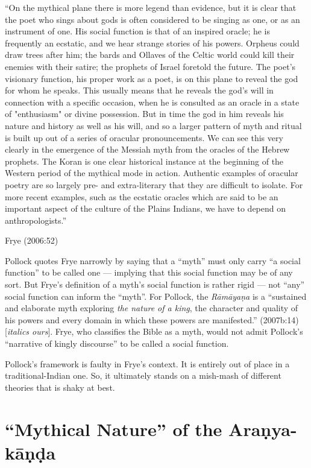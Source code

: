 \begin{myquote}
“On the mythical plane there is more legend than evidence, but it is clear that the poet who sings about gods is often considered to be singing as one, or as an instrument of one. His social function is that of an inspired oracle; he is frequently an ecstatic, and we hear strange stories of his powers. Orpheus could draw trees after him; the bards and Ollaves of the Celtic world could kill their enemies with their satire; the prophets of Israel foretold the future. The poet's visionary function, his proper work as a poet, is on this plane to reveal the god for whom he speaks. This usually means that he reveals the god's will in connection with a specific occasion, when he is consulted as an oracle in a state of "enthusiasm" or divine possession. But in time the god in him reveals his nature and history as well as his will, and so a larger pattern of myth and ritual is built up out of a series of oracular pronouncements. We can see this very clearly in the emergence of the Messiah myth from the oracles of the Hebrew prophets. The Koran is one clear historical instance at the beginning of the Western period of the mythical mode in action. Authentic examples of oracular poetry are so largely pre- and extra-literary that they are difficult to isolate. For more recent examples, such as the ecstatic oracles which are said to be an important aspect of the culture of the Plains Indians, we have to depend on anthropologists.”

\hfill Frye (2006:52)
\end{myquote}

Pollock quotes Frye narrowly by saying that a “myth” must only carry  “a social function” to be called one --- implying that this social function may be of any sort. But Frye’s definition of a myth’s social function is rather rigid --- not “any” social function can inform the “myth”. For Pollock, the {\sl Rāmāyaṇa} is a “sustained and elaborate myth exploring {\sl the nature of a king}, the character and quality of his powers and every domain in which these powers are manifested.” (2007b:14) [{\sl italics ours}]. Frye, who classifies the Bible as a myth, would not admit Pollock’s “narrative of kingly discourse” to be called a social function. 

Pollock’s framework is faulty in Frye’s context. It is entirely out of place in a traditional-Indian one.  So, it ultimately stands on a mish-mash of different theories that is shaky at best.  

\section{“Mythical Nature” of the Araṇya-kāṇḍa}\label{sec2.3}

